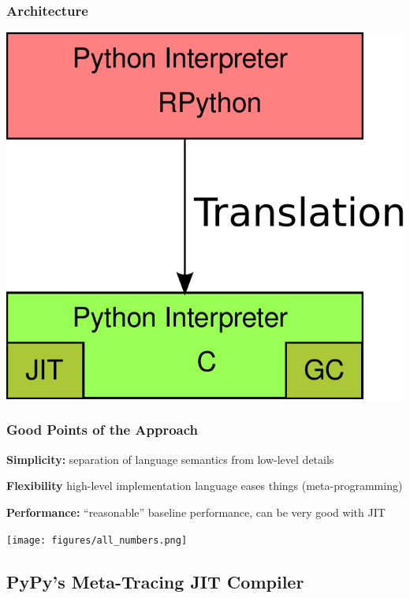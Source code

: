 \documentclass[utf8x]{beamer}
\begin{document}
\begin{frame}[plain]
  \frametitle{Architecture}
  \includegraphics[scale=0.4]{figures/architecture.pdf}
\end{frame}



\begin{frame}
  \frametitle{Good Points of the Approach}
  {\bf Simplicity:} separation of language semantics from low-level details
  \pause

  {\bf Flexibility} high-level implementation language eases things (meta-programming)
  \pause

  {\bf Performance:} ``reasonable'' baseline performance, can be very good with JIT
\end{frame}


\begin{frame}[plain]
  \texttt{[image: figures/all\_numbers.png]}
\end{frame}

\subsection{PyPy's Meta-Tracing JIT Compiler}

%
\end{document}
